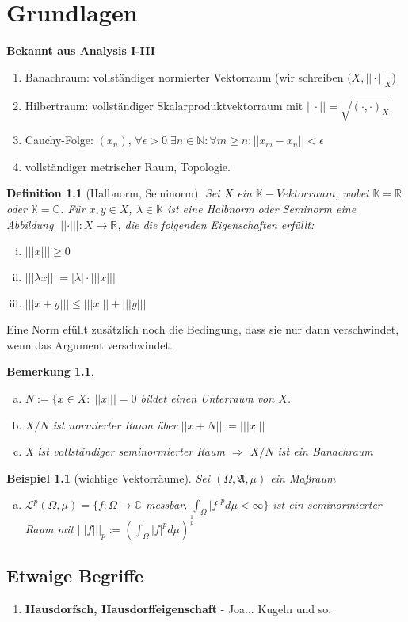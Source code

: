 \documentclass[ngerman]{report}
\newtheorem{definition}[section]{Definition}
\newtheorem{bem}[section]{Bemerkung}
\newtheorem{bsp}[section]{Beispiel}
\newcommand{\R}{\mathbb{R}}
\newcommand{\N}{\mathbb{N}}
\newcommand{\C}{\mathbb{C}}
\newcommand{\K}{\mathbb{K}}
\newcommand{\hA}{\mathfrak{A}}
\newcommand{\hL}{\mathcal{L}}
\begin{document}
\chapter{Grundlagen}
\textbf{Bekannt aus Analysis I-III}
\begin{enumerate}[-]
\item 
Banachraum: vollständiger normierter Vektorraum (wir schreiben $(X, ||\cdot ||_X$)

\item 
Hilbertraum: vollständiger Skalarproduktvektorraum mit $||\cdot || = \sqrt{(\cdot , \cdot )_X}$
\item
Cauchy-Folge: $(x_n),\,  \forall \epsilon > 0\; \exists n \in \N : \forall m \geq n : ||x_m-x_n||<\epsilon$
\item 
vollständiger metrischer Raum, Topologie.
\end{enumerate}

\begin{definition}[Halbnorm, Seminorm]
Sei $X$ ein $\K-Vektorraum$, wobei $\K = \R$ oder $\K = \C$. 
Für $x,y\in X$, $\lambda \in \K$ ist eine Halbnorm oder Seminorm eine Abbildung
$|||\cdot |||:X \rightarrow \R$, die die folgenden Eigenschaften erfüllt:
\begin{enumerate}[(i)]
\item $|||x|||\geq 0$
\item $|||\lambda x||| = |\lambda|\cdot |||x|||$
\item $|||x+y||| \leq |||x||| + |||y|||$
\end{enumerate}
\end{definition}

Eine Norm efüllt zusätzlich noch die Bedingung, dass sie nur dann verschwindet, wenn das Argument verschwindet.

\begin{bem}
\begin{enumerate}[(a)]
\item 
$N:=\{x\in X: |||x|||=0$ bildet einen Unterraum von $X$.
\item 
$X/N$ ist normierter Raum über $||x+N|| := |||x|||$
\item 
X ist vollständiger seminormierter Raum $\Rightarrow$ $X/N$ ist ein Banachraum 
\end{enumerate}
\end{bem}

\begin{bsp}[wichtige Vektorräume]
Sei $(\Omega,\hA,\mu)$ ein Maßraum
\begin{enumerate}[(a)]
\item $\hL^p(\Omega,\mu) = \{f:\Omega \rightarrow \C$ messbar, $\int_\Omega |f|^p d\mu < \infty \}$ ist ein seminormierter Raum mit $|||f|||_p := (\int_\Omega |f|^p d\mu )^{\frac{1}{p}}$

\end{enumerate}
\end{bsp}


\section*{Etwaige Begriffe}
\begin{enumerate}
\item
\textbf{Hausdorfsch, Hausdorffeigenschaft} -  Joa... Kugeln und so.

\end{enumerate}
\end{document}
